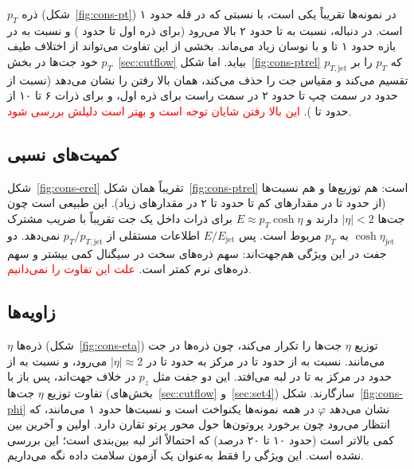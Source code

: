 $p_T$ ذره (شکل~\ref{fig:cons-pt}) در نمونه‌ها تقریباً یکی است، با نسبتی که در قله حدود ۱ است. در دنباله، نسبت \Zjet به \bbbb تا حدود ۲ بالا می‌رود (برای ذره اول تا حدود ) و نسبت \ttZ به \ttbb در بازه حدود ۱ تا  و با نوسان زیاد می‌ماند. بخشی از این تفاوت می‌تواند از اختلاف طیف $p_T$ خود جت‌ها در بخش~\ref{sec:cutflow} بیاید. اما شکل~\ref{fig:cons-ptrel} که $p_T$ را بر $p_{T,\mathrm{jet}}$ تقسیم می‌کند و مقیاس جت را حذف می‌کند، همان بالا رفتن را نشان می‌دهد (نسبت از حدود  در سمت چپ تا حدود ۲ در سمت راست برای ذره اول، و برای ذرات ۶ تا ۱۰ از حدود  تا ). \textcolor{red}{این بالا رفتن شایان توجه است و بهتر است دلیلش بررسی شود.}

\subsection{کمیت‌های نسبی}
شکل~\ref{fig:cons-erel} تقریباً همان شکل~\ref{fig:cons-ptrel} است: هم توزیع‌ها و هم نسبت‌ها (از حدود  تا  در مقدارهای کم تا حدود  تا ۲ در مقدارهای زیاد). این طبیعی است چون جت‌ها $|\eta|<2$ دارند و $E\approx p_T\cosh\eta$ برای ذرات داخل یک جت تقریباً با ضریب مشترک $\cosh\eta_\mathrm{jet}$ به $p_T$ مربوط است. پس $E/E_\mathrm{jet}$ اطلاعات مستقلی از $p_T/p_{T,\mathrm{jet}}$ نمی‌دهد. دو جفت در این ویژگی هم‌جهت‌اند: سهم ذره‌های سخت در سیگنال کمی بیشتر و سهم ذره‌های نرم کمتر است. \textcolor{red}{علت این تفاوت را نمی‌دانیم.}

\subsection{زاویه‌ها}
$\eta$ ذره‌ها (شکل~\ref{fig:cons-eta}) توزیع $\eta$ جت‌ها را تکرار می‌کند، چون ذره‌ها در جت می‌مانند. نسبت \Zjet به \bbbb از حدود  تا  در مرکز به حدود  تا  در $|\eta|\approx2$ می‌رود، و نسبت \ttZ به \ttbb از حدود  در مرکز به  تا  در لبه می‌افتد. این دو جفت مثل $p_z$ در خلاف جهت‌اند، پس باز با تفاوت توزیع $\eta$ جت‌ها (بخش‌های~\ref{sec:cutflow} و~\ref{sec:set4}) سازگارند. شکل~\ref{fig:cons-phi} نشان می‌دهد $\varphi$ در همه نمونه‌ها یکنواخت است و نسبت‌ها حدود ۱ می‌مانند، که انتظار می‌رود چون برخورد پروتون‌ها حول محور پرتو تقارن دارد. اولین و آخرین بین کمی بالاتر است (حدود ۱۰ تا ۲۰ درصد) که احتمالاً اثر لبه بین‌بندی است؛ این بررسی نشده است. این ویژگی را فقط به‌عنوان یک آزمون سلامت داده نگه می‌داریم.

